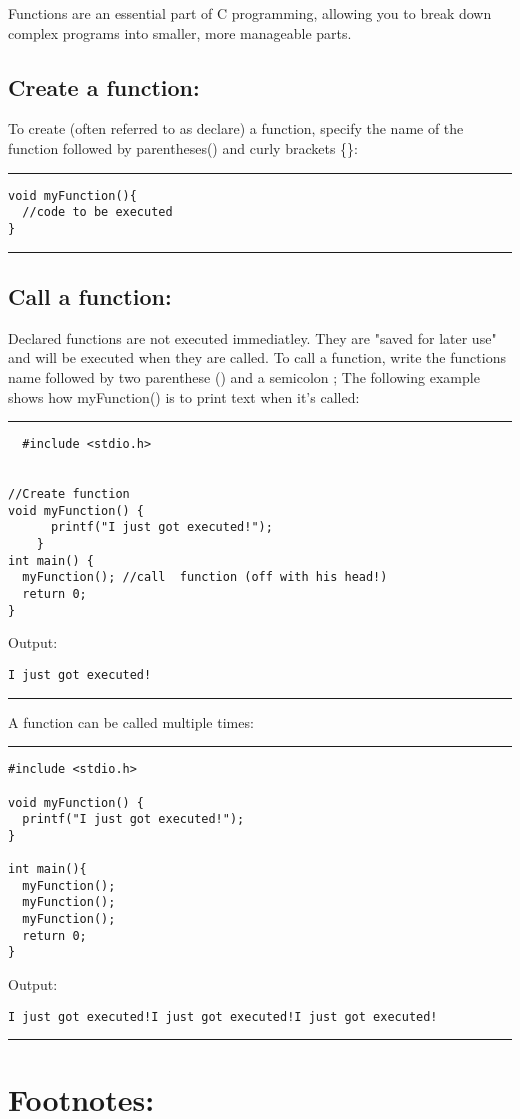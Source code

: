 \documentclass[a4paper]{article}
\begin{document}
Functions are an essential part of C programming, allowing you to break down
complex programs into smaller, more manageable parts.

\subsection{Create a function:}
\label{sec:org49defdb}
To create (often referred to as declare) a function, specify the name of the
function followed by parentheses() and curly brackets \{\}:

\noindent\rule{\textwidth}{0.5pt}
\begin{verbatim}
void myFunction(){
  //code to be executed
}
\end{verbatim}

\noindent\rule{\textwidth}{0.5pt}
\subsection{Call a function:}
\label{sec:org6dcbc18}
Declared functions are not executed immediatley. They are "saved for later use"
and will be executed when they are called.
To call a function, write the functions name followed by two parenthese () and a
semicolon ;
The following example shows how myFunction() is to print text when it's called:

\noindent\rule{\textwidth}{0.5pt}
\begin{verbatim}
  #include <stdio.h>


//Create function
void myFunction() {
      printf("I just got executed!");
    }
int main() {
  myFunction(); //call  function (off with his head!)
  return 0;
}  

\end{verbatim}
Output:
\begin{verbatim}
I just got executed!
\end{verbatim}

\noindent\rule{\textwidth}{0.5pt}
A function can be called multiple times:

\noindent\rule{\textwidth}{0.5pt}
\begin{verbatim}
#include <stdio.h>

void myFunction() {
  printf("I just got executed!");
}

int main(){
  myFunction();
  myFunction();
  myFunction();
  return 0;
}
\end{verbatim}
Output:
\begin{verbatim}
I just got executed!I just got executed!I just got executed!
\end{verbatim}

\noindent\rule{\textwidth}{0.5pt}



























\clearpage
\section{Footnotes:}
\label{sec:orgb59618a}
\end{document}
